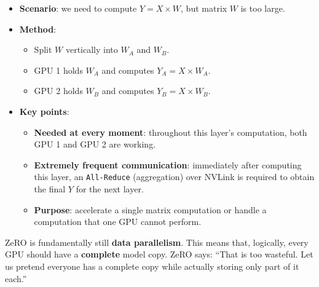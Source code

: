 \begin{itemize}
\tightlist
\item
  \textbf{Scenario}: we need to compute \(Y = X \times W\), but matrix \(W\) is too large.
\item
{}
  \textbf{Method}:

  \begin{itemize}
  \tightlist
  \item
    Split \(W\) vertically into \(W_A\) and \(W_B\).
  \item
    GPU 1 holds \(W_A\) and computes \(Y_A = X \times W_A\).
  \item
    GPU 2 holds \(W_B\) and computes \(Y_B = X \times W_B\).
  \end{itemize}
\item
{}
  \textbf{Key points}:

  \begin{itemize}
  \tightlist
  \item
    \textbf{Needed at every moment}: throughout this layer's computation, both GPU 1 and GPU 2 are working.
  \item
    \textbf{Extremely frequent communication}: immediately after computing this layer, an \texttt{All-Reduce} (aggregation) over NVLink is required to obtain the final \(Y\) for the next layer.
  \item
    \textbf{Purpose}: accelerate a single matrix computation or handle a computation that one GPU cannot perform.
  \end{itemize}
\end{itemize}

ZeRO is fundamentally still \textbf{data parallelism}. This means that, logically, every GPU should have a \textbf{complete} model copy. ZeRO says: ``That is too wasteful. Let us pretend everyone has a complete copy while actually storing only part of it each.''

